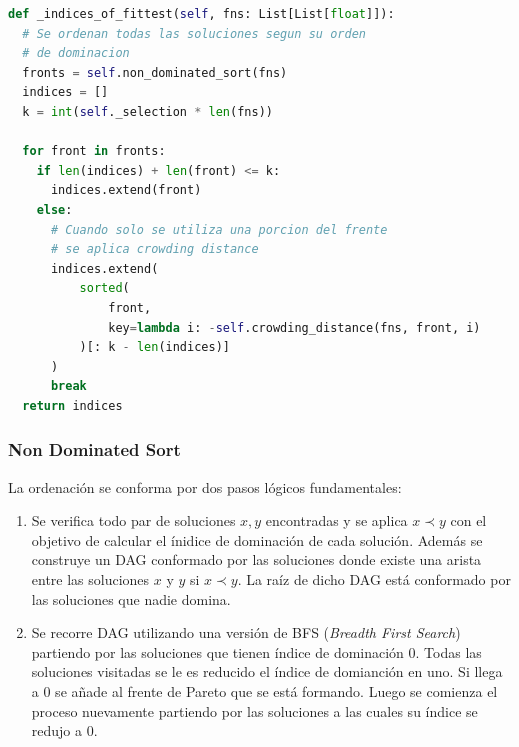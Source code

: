 \begin{lstlisting}[caption=Nueva ordenaci\'on, language=Python]
def _indices_of_fittest(self, fns: List[List[float]]):
  # Se ordenan todas las soluciones segun su orden
  # de dominacion
  fronts = self.non_dominated_sort(fns)
  indices = []
  k = int(self._selection * len(fns))

  for front in fronts:
    if len(indices) + len(front) <= k:
      indices.extend(front)
    else:
      # Cuando solo se utiliza una porcion del frente
      # se aplica crowding distance
      indices.extend(
          sorted(
              front,
              key=lambda i: -self.crowding_distance(fns, front, i)
          )[: k - len(indices)]
      )
      break
  return indices
\end{lstlisting}

\subsubsection{Non Dominated Sort}
La ordenaci\'on se conforma por dos pasos l\'ogicos fundamentales:
\begin{enumerate}
    \item Se verifica todo par de soluciones $x, y$ encontradas y se aplica $x \prec y$ con el objetivo de calcular el \'inidice de dominaci\'on de cada soluci\'on. Adem\'as se construye un DAG conformado por las soluciones donde existe una arista entre las soluciones $x$ y $y$ si $x \prec y$. La ra\'iz de dicho DAG est\'a conformado por las soluciones que nadie domina.
    \item Se recorre DAG utilizando una versi\'on de BFS (\textit{Breadth First Search}) partiendo por las soluciones que tienen \'indice de dominaci\'on 0. Todas las soluciones visitadas se le es reducido el \'indice de domianci\'on en uno. Si llega a 0 se a\~nade al frente de Pareto que se est\'a formando. Luego se comienza el proceso nuevamente partiendo por las soluciones a las cuales su \'indice se redujo a 0.
\end{enumerate}

